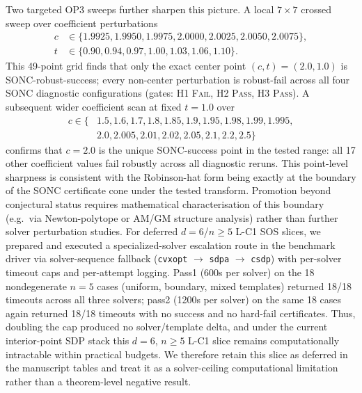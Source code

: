 \documentclass{article}
\begin{document}
Two targeted OP3 sweeps further sharpen this picture.
A local $7\times 7$ crossed sweep over coefficient perturbations
\[
\begin{aligned}
c &\in \{1.9925,1.9950,1.9975,2.0000,2.0025,2.0050,2.0075\},\\
t &\in \{0.90,0.94,0.97,1.00,1.03,1.06,1.10\}.
\end{aligned}
\]
This 49-point grid finds that only the exact
center point $(c,t)=(2.0,1.0)$ is SONC-robust-success; every non-center perturbation
is robust-fail across all four SONC diagnostic configurations (gates: H1 \textsc{Fail},
H2 \textsc{Pass}, H3 \textsc{Pass}).
A subsequent wider coefficient scan at fixed $t=1.0$ over
\[
\begin{aligned}
c \in \{&1.5,1.6,1.7,1.8,1.85,1.9,1.95,1.98,1.99,1.995,\\
&2.0,2.005,2.01,2.02,2.05,2.1,2.2,2.5\}
\end{aligned}
\]
confirms that $c=2.0$ is the unique SONC-success point in the tested range: all 17 other
coefficient values fail robustly across all diagnostic reruns.
This point-level sharpness is consistent with the Robinson-hat form being exactly at the
boundary of the SONC certificate cone under the tested transform. Promotion beyond
conjectural status requires mathematical characterisation of this boundary (e.g.\ via
Newton-polytope or AM/GM structure analysis) rather than further solver perturbation studies.
For deferred $d=6$/$n\geq 5$ L-C1 SOS slices, we prepared and executed a specialized-solver
escalation route in the benchmark driver via solver-sequence fallback
(\texttt{cvxopt} $\rightarrow$ \texttt{sdpa} $\rightarrow$ \texttt{csdp})
with per-solver timeout caps and per-attempt logging.
Pass1 (600s per solver) on the 18 nondegenerate $n=5$ cases (uniform, boundary, mixed templates)
returned 18/18 timeouts across all three solvers; pass2 (1200s per solver) on the same 18 cases
again returned 18/18 timeouts with no success and no hard-fail certificates.
Thus, doubling the cap produced no solver/template delta, and under the current interior-point SDP
stack this $d=6$, $n\geq 5$ L-C1 slice remains computationally intractable within practical budgets.
We therefore retain this slice as deferred in the manuscript tables and treat it as a solver-ceiling
computational limitation rather than a theorem-level negative result.


\end{document}
